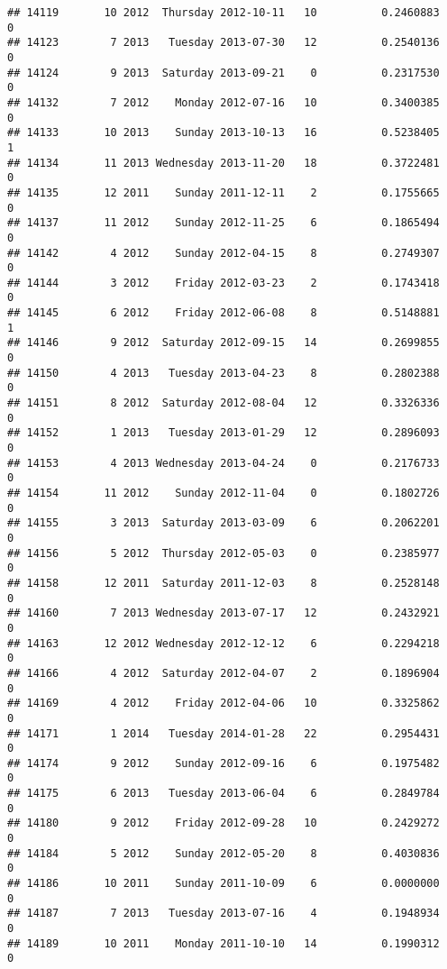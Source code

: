 \documentclass[
]{article}
\begin{document}
\begin{verbatim}
## 14119       10 2012  Thursday 2012-10-11   10          0.2460883             0
## 14123        7 2013   Tuesday 2013-07-30   12          0.2540136             0
## 14124        9 2013  Saturday 2013-09-21    0          0.2317530             0
## 14132        7 2012    Monday 2012-07-16   10          0.3400385             0
## 14133       10 2013    Sunday 2013-10-13   16          0.5238405             1
## 14134       11 2013 Wednesday 2013-11-20   18          0.3722481             0
## 14135       12 2011    Sunday 2011-12-11    2          0.1755665             0
## 14137       11 2012    Sunday 2012-11-25    6          0.1865494             0
## 14142        4 2012    Sunday 2012-04-15    8          0.2749307             0
## 14144        3 2012    Friday 2012-03-23    2          0.1743418             0
## 14145        6 2012    Friday 2012-06-08    8          0.5148881             1
## 14146        9 2012  Saturday 2012-09-15   14          0.2699855             0
## 14150        4 2013   Tuesday 2013-04-23    8          0.2802388             0
## 14151        8 2012  Saturday 2012-08-04   12          0.3326336             0
## 14152        1 2013   Tuesday 2013-01-29   12          0.2896093             0
## 14153        4 2013 Wednesday 2013-04-24    0          0.2176733             0
## 14154       11 2012    Sunday 2012-11-04    0          0.1802726             0
## 14155        3 2013  Saturday 2013-03-09    6          0.2062201             0
## 14156        5 2012  Thursday 2012-05-03    0          0.2385977             0
## 14158       12 2011  Saturday 2011-12-03    8          0.2528148             0
## 14160        7 2013 Wednesday 2013-07-17   12          0.2432921             0
## 14163       12 2012 Wednesday 2012-12-12    6          0.2294218             0
## 14166        4 2012  Saturday 2012-04-07    2          0.1896904             0
## 14169        4 2012    Friday 2012-04-06   10          0.3325862             0
## 14171        1 2014   Tuesday 2014-01-28   22          0.2954431             0
## 14174        9 2012    Sunday 2012-09-16    6          0.1975482             0
## 14175        6 2013   Tuesday 2013-06-04    6          0.2849784             0
## 14180        9 2012    Friday 2012-09-28   10          0.2429272             0
## 14184        5 2012    Sunday 2012-05-20    8          0.4030836             0
## 14186       10 2011    Sunday 2011-10-09    6          0.0000000             0
## 14187        7 2013   Tuesday 2013-07-16    4          0.1948934             0
## 14189       10 2011    Monday 2011-10-10   14          0.1990312             0

\end{verbatim}
\end{document}
